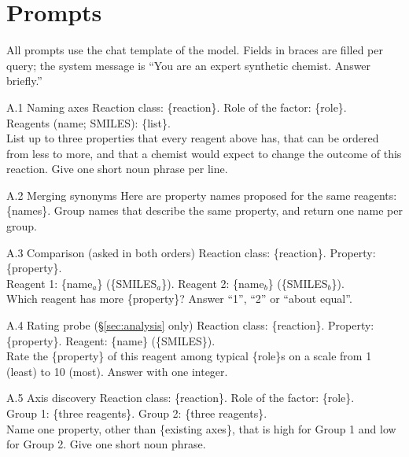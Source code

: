 \section{Prompts}
\label{app:prompts}

All prompts use the chat template of the model. Fields in braces are filled per query; the system message is ``You are an expert synthetic chemist. Answer briefly.''

\begin{promptbox}{A.1 Naming axes}
Reaction class: \{reaction\}. Role of the factor: \{role\}.\\
Reagents (name; SMILES): \{list\}.\\
List up to three properties that every reagent above has, that can be ordered from less to more, and that a chemist would expect to change the outcome of this reaction. Give one short noun phrase per line.
\end{promptbox}

\begin{promptbox}{A.2 Merging synonyms}
Here are property names proposed for the same reagents: \{names\}. Group names that describe the same property, and return one name per group.
\end{promptbox}

\begin{promptbox}{A.3 Comparison (asked in both orders)}
Reaction class: \{reaction\}. Property: \{property\}.\\
Reagent 1: \{name$_a$\} (\{SMILES$_a$\}). Reagent 2: \{name$_b$\} (\{SMILES$_b$\}).\\
Which reagent has more \{property\}? Answer ``1'', ``2'' or ``about equal''.
\end{promptbox}

\begin{promptbox}{A.4 Rating probe (\S\ref{sec:analysis} only)}
Reaction class: \{reaction\}. Property: \{property\}. Reagent: \{name\} (\{SMILES\}).\\
Rate the \{property\} of this reagent among typical \{role\}s on a scale from 1 (least) to 10 (most). Answer with one integer.
\end{promptbox}

\begin{promptbox}{A.5 Axis discovery}
Reaction class: \{reaction\}. Role of the factor: \{role\}.\\
Group 1: \{three reagents\}. Group 2: \{three reagents\}.\\
Name one property, other than \{existing axes\}, that is high for Group 1 and low for Group 2. Give one short noun phrase.
\end{promptbox}

